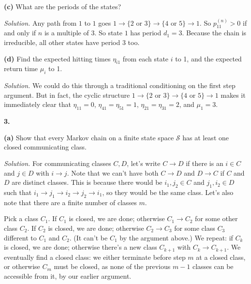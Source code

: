 \documentclass[
  a4paper,
]{article}
\theoremstyle{definition}
\theoremstyle{definition}
\theoremstyle{definition}
\theoremstyle{remark}
\begin{document}
\textbf{(c)} What are the periods of the states?

\begin{myanswers}
\emph{Solution.} Any path from \(1\) to \(1\) goes \(1 \to \{2 \text{ or }3\} \to \{4 \text{ or }5\} \to 1\). So \(p_{11}^{(n)} > 0\) if and only if \(n\) is a multiple of \(3\). So state \(1\) has period \(d_1 = 3\). Because the chain is irreducible, all other states have period \(3\) too.

\end{myanswers}

\textbf{(d)} Find the expected hitting times \(\eta_{i1}\) from each state \(i\) to 1, and the expected return time \(\mu_i\) to 1.

\begin{myanswers}
\emph{Solution.} We could do this through a traditional conditioning on the first step argument. But in fact, the cyclic structure \(1 \to \{2 \text{ or }3\} \to \{4 \text{ or }5\} \to 1\) makes it immediately clear that \(\eta_11 = 0\), \(\eta_{41}=\eta_{51} = 1\), \(\eta_{21} = \eta_{31} = 2\), and \(\mu_1 = 3\).

\end{myanswers}

\textbf{3.}

\textbf{(a)} Show that every Markov chain on a finite state space \(\mathcal S\) has at least one closed communicating class.

\begin{myanswers}
\emph{Solution.} For communicating classes \(C,D\), let's write \(C \to D\) if there is an \(i \in C\) and \(j \in D\) with \(i \to j\). Note that we can't have both \(C \to D\) and \(D \to C\) if \(C\) and \(D\) are distinct classes. This is because there would be \(i_1, j_2 \in C\) and \(j_1, i_2 \in D\) such that \(i_1 \to j_1 \to i_2 \to j_2 \to i_1\), so they would be the same class. Let's also note that there are a finite number of classes \(m\).

Pick a class \(C_1\). If \(C_1\) is closed, we are done; otherwise \(C_1 \to C_2\) for some other class \(C_2\). If \(C_2\) is closed, we are done; otherwise \(C_2 \to C_3\) for some class \(C_3\) different to \(C_1\) and \(C_2\). (It can't be \(C_1\) by the argument above.) We repeat: if \(C_k\) is closed, we are done; otherwise there's a new class \(C_{k+1}\) with \(C_k \to C_{k+1}\). We eventually find a closed class: we either terminate before step \(m\) at a closed class, or otherwise \(C_m\) must be closed, as none of the previous \(m-1\) classes can be accessible from it, by our earlier argument.

\end{myanswers}
\end{document}
